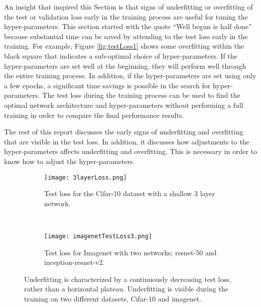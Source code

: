 \documentclass{article} %
\begin{document}
An insight that inspired this Section is that signs of underfitting or overfitting of the test or validation loss early in the training process are useful for tuning the hyper-parameters.  This section started with the quote ``Well begun is half done'' because substantial time can be saved by attending to the test loss early in the training.  For example, Figure \ref{fig:testLoss1} shows some overfitting within the black square that indicates a sub-optimal choice of hyper-parameters.  If the hyper-parameters are set well at the beginning, they will perform well through the entire training process.   In addition, if the hyper-parameters are set using only a few epochs, a significant time savings is possible in the search for hyper-parameters.  The test loss during the training process can be used to find the optimal network architecture and hyper-parameters without performing a full training in order to compare the final performance results.

The rest of this report discusses the early signs of underfitting and overfitting that are visible in the test loss.  In addition, it discusses how adjustments to the hyper-parameters affects underfitting and overfitting.  This is necessary in order to know how to adjust the hyper-parameters.  

\begin{figure}[tbh]
	\centering
	\begin{subfigure}[b]{0.4\textwidth}
		\texttt{[image: 3layerLoss.png]}
		\caption{Test loss for the Cifar-10 dataset with a shallow 3 layer network. }
		\label{fig:3layerLoss}       %
	\end{subfigure}
	\quad
	\hfill
	~ %
	\centering
	\begin{subfigure}[b]{0.52\textwidth}
		\texttt{[image: imagenetTestLoss3.png]}
		\caption{Test loss for Imagenet with two networks; resnet-50 and inception-resnet-v2.}
		\label{fig:imagenetTestLoss3}       %
	\end{subfigure}
	\caption{Underfitting is characterized by a continuously decreasing test loss, rather than a horizontal plateau. Underfitting is  visible during the training on two different datasets, Cifar-10 and imagenet.}
	\label{fig:Loss1}
	\vspace{-5pt}	
\end{figure}
\end{document}
